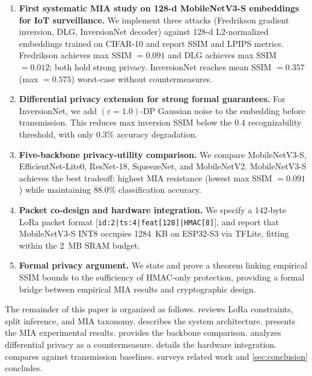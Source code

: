 \documentclass[journal]{IEEEtran}
\newcommand{\eps}{\varepsilon}
\newcommand{\MN}{MobileNetV3-S\xspace}
\begin{document}
\begin{enumerate}
  \item[\textbf{C1}] \textbf{First systematic MIA study on 128-d \MN
    embeddings for IoT surveillance.}
    We implement three attacks (Fredrikson gradient inversion, DLG,
    InversionNet decoder) against 128-d L2-normalized embeddings trained
    on CIFAR-10 and report SSIM and LPIPS metrics.
    Fredrikson achieves max SSIM $= 0.091$ and DLG achieves max SSIM
    $= 0.012$; both hold strong privacy.
    InversionNet reaches mean SSIM $= 0.357$ (max $= 0.575$) worst-case without
    countermeasures.

  \item[\textbf{C2}] \textbf{Differential privacy extension for strong
    formal guarantees.}
    For InversionNet, we add $(\eps=1.0)$-DP Gaussian noise to the
    embedding before transmission.
    This reduces max inversion SSIM below the $0.4$
    recognizability threshold, with only $0.3\%$ accuracy degradation.

  \item[\textbf{C3}] \textbf{Five-backbone privacy-utility comparison.}
    We compare \MN, EfficientNet-Lite0, ResNet-18, SqueezeNet, and
    MobileNetV2.
    \MN achieves the best tradeoff: highest MIA resistance (lowest
    max SSIM $= 0.091$) while maintaining $88.0\%$ classification accuracy.

  \item[\textbf{C4}] \textbf{Packet co-design and hardware integration.}
    We specify a 142-byte LoRa packet format
    [\texttt{id:2|ts:4|feat[128]|HMAC[8]}],
    and report that \MN INT8 occupies \SI{1284}{KB} on ESP32-S3
    via TFLite, fitting within the \SI{2}{MB} SRAM budget.

  \item[\textbf{C5}] \textbf{Formal privacy argument.}
    We state and prove a theorem linking empirical SSIM bounds to
    the sufficiency of HMAC-only protection, providing a formal
    bridge between empirical MIA results and cryptographic design.
\end{enumerate}

The remainder of this paper is organized as follows.
 reviews LoRa constraints, split inference, and
MIA taxonomy.
 describes the system architecture.
 presents the MIA experimental results.
 provides the backbone comparison.
 analyzes differential privacy as a countermeasure.
 details the hardware integration.
 compares against transmission baselines.
 surveys related work and \cref{sec:conclusion} concludes.
\end{document}
